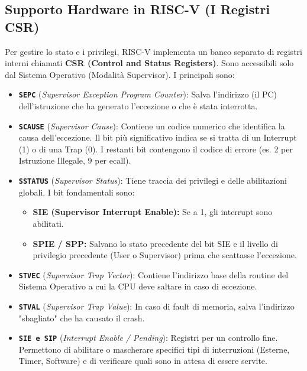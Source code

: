 \documentclass[12pt, a4paper]{article}
\begin{document}
\newpage

\subsection{Supporto Hardware in RISC-V (I Registri CSR)}
Per gestire lo stato e i privilegi, RISC-V implementa un banco separato di registri interni chiamati \textbf{CSR (Control and Status Registers)}. Sono accessibili solo dal Sistema Operativo (Modalità Supervisor). I principali sono:
\begin{itemize}
    \item \texttt{\textbf{SEPC}} (\textit{Supervisor Exception Program Counter}): Salva l'indirizzo (il PC) dell'istruzione che ha generato l'eccezione o che è stata interrotta.
    \item \texttt{\textbf{SCAUSE}} (\textit{Supervisor Cause}): Contiene un codice numerico che identifica la causa dell'eccezione. Il bit più significativo indica se si tratta di un Interrupt (1) o di una Trap (0). I restanti bit contengono il codice di errore (es. 2 per Istruzione Illegale, 9 per ecall).
    \item \texttt{\textbf{SSTATUS}} (\textit{Supervisor Status}): Tiene traccia dei privilegi e delle abilitazioni globali. I bit fondamentali sono:
    \begin{itemize}
        \item \textbf{SIE (Supervisor Interrupt Enable):} Se a 1, gli interrupt sono abilitati.
        \item \textbf{SPIE / SPP:} Salvano lo stato precedente del bit SIE e il livello di privilegio precedente (User o Supervisor) prima che scattasse l'eccezione.
    \end{itemize}
    \item \texttt{\textbf{STVEC}} (\textit{Supervisor Trap Vector}): Contiene l'indirizzo base della routine del Sistema Operativo a cui la CPU deve saltare in caso di eccezione.
    \item \texttt{\textbf{STVAL}} (\textit{Supervisor Trap Value}): In caso di fault di memoria, salva l'indirizzo "sbagliato" che ha causato il crash.
    \item \texttt{\textbf{SIE e SIP}} (\textit{Interrupt Enable / Pending}): Registri per un controllo fine. Permettono di abilitare o mascherare specifici tipi di interruzioni (Esterne, Timer, Software) e di verificare quali sono in attesa di essere servite.
\end{itemize}
\end{document}
